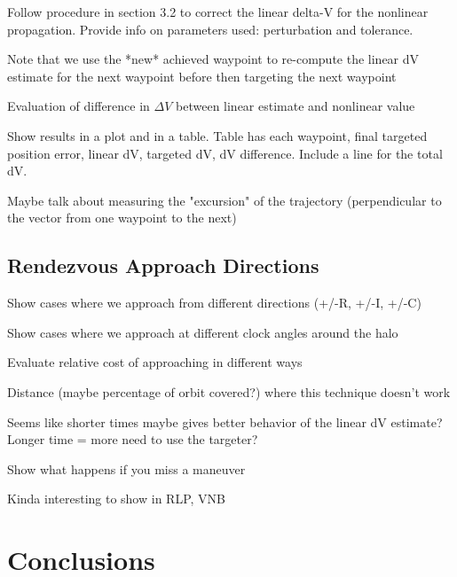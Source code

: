 \documentclass[]{article}
\begin{document}
Follow procedure in section 3.2 to correct the linear delta-V for the nonlinear propagation.  Provide info on parameters used: perturbation and tolerance.

Note that we use the *new* achieved waypoint to re-compute the linear dV estimate for the next waypoint before then targeting the next waypoint

Evaluation of difference in \(\Delta V\) between linear estimate and nonlinear value

Show results in a plot and in a table.  Table has each waypoint, final targeted position error, linear dV, targeted dV, dV difference.  Include a line for the total dV.

Maybe talk about measuring the "excursion" of the trajectory (perpendicular to the vector from one waypoint to the next)

\subsection{Rendezvous Approach Directions}

Show cases where we approach from different directions (+/-R, +/-I, +/-C)

Show cases where we approach at different clock angles around the halo

Evaluate relative cost of approaching in different ways

Distance (maybe percentage of orbit covered?) where this technique doesn't work

Seems like shorter times maybe gives better behavior of the linear dV estimate?  Longer time = more need to use the targeter?

Show what happens if you miss a maneuver

Kinda interesting to show in RLP, VNB

\section{Conclusions}

\begin{thebibliography}{99}
\end{thebibliography}
\end{document}
